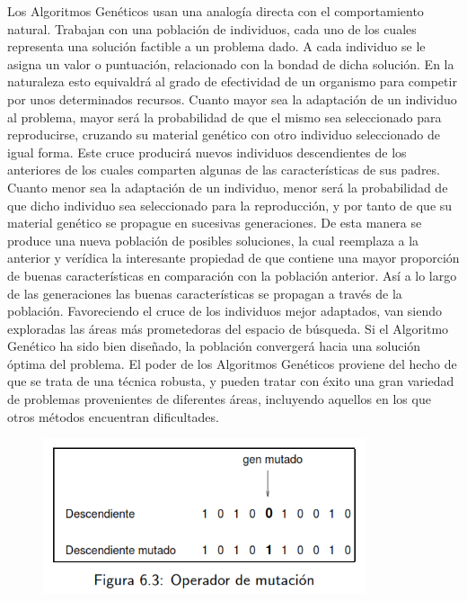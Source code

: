 \documentclass[11pt]{article}
\begin{document}
Los Algoritmos Genéticos usan una analogía directa con el comportamiento natural. Trabajan con una población de individuos, cada uno de los cuales representa una solución factible a un problema dado. A cada individuo se le asigna un valor o puntuación, relacionado con la bondad de dicha solución. En la naturaleza esto equivaldrá al grado de efectividad de un organismo para competir por unos determinados recursos. Cuanto mayor sea la adaptación de un individuo al problema, mayor será la probabilidad de que el mismo sea seleccionado para reproducirse, cruzando su material genético con otro individuo seleccionado de igual forma. Este cruce producirá nuevos individuos descendientes de los anteriores de los cuales comparten algunas de las características de sus padres.\\

Cuanto menor sea la adaptación de un individuo, menor será la probabilidad de que dicho individuo sea seleccionado para la reproducción, y por tanto de que su material genético se propague en sucesivas generaciones. De esta manera se produce una nueva población de posibles soluciones, la cual reemplaza a la anterior y verídica la interesante propiedad de que contiene una mayor proporción de buenas características en comparación con la población anterior. Así a lo largo de las generaciones las buenas características se propagan a través de la población. Favoreciendo el cruce de los individuos mejor adaptados, van siendo exploradas las áreas más prometedoras del espacio de búsqueda. Si el Algoritmo Genético ha sido bien diseñado, la población convergerá hacia una solución óptima del problema. El poder de los Algoritmos Genéticos proviene del hecho de que se trata de una técnica robusta, y pueden tratar con éxito una gran variedad de problemas provenientes de diferentes áreas, incluyendo aquellos en los que otros métodos encuentran dificultades.\\

\begin{figure}[htp]
\centering
\includegraphics[width=9.5cm]{1.jpg}
\end{figure}
\end{document}
